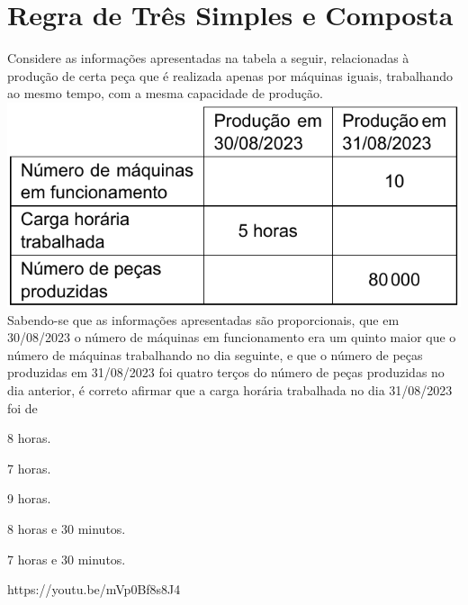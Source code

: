 \chapter{Regra de Três Simples e Composta}

{Considere as informações apresentadas na tabela a seguir, relacionadas à produção de certa peça que é
realizada apenas por máquinas iguais, trabalhando ao mesmo tempo, com a mesma capacidade de produção.\\
\includegraphics[scale=.5]{fig002.png}\\
Sabendo-se que as informações apresentadas são proporcionais, que em 30/08/2023 o número de máquinas
em funcionamento era um quinto maior que o número de máquinas trabalhando no dia seguinte, e que o número
de peças produzidas em 31/08/2023 foi quatro terços do número de peças produzidas no dia anterior, é correto afirmar que a carga horária trabalhada no dia 31/08/2023 foi de}
{\item 8 horas.
\item 7 horas.
\item 9 horas.
\item 8 horas e 30 minutos.
\item 7 horas e 30 minutos.}
{https://youtu.be/mVp0Bf8s8J4}

